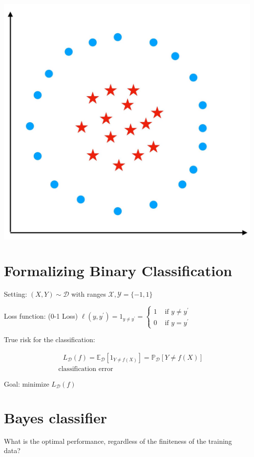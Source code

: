 \documentclass[10pt]{article}
\begin{document}
\begin{center}
\includegraphics[max width=\textwidth]{2023_12_30_cf784c471dfd1dd5afbag-26}
\end{center}

\section*{Formalizing Binary Classification}
Setting: $(X, Y) \sim \mathscr{D}$ with ranges $\mathscr{X}, \mathscr{Y}=\{-1,1\}$

Loss function: (0-1 Loss) $\ell\left(y, y^{\prime}\right)=1_{y \neq y^{\prime}}= \begin{cases}1 & \text { if } y \neq y^{\prime} \\ 0 & \text { if } y=y^{\prime}\end{cases}$

True risk for the classification:

$$
\begin{aligned}
& \quad L_{\mathscr{D}}(f)=\mathbb{E}_{\mathscr{D}}\left[1_{Y \neq f(X)}\right]=\mathbb{P}_{\mathscr{D}}[Y \neq f(X)] \\
& \text { classification error }
\end{aligned}
$$

Goal: minimize $L_{\mathscr{D}}(f)$

\section*{Bayes classifier}
What is the optimal performance, regardless of the finiteness of the training data?
\end{document}
